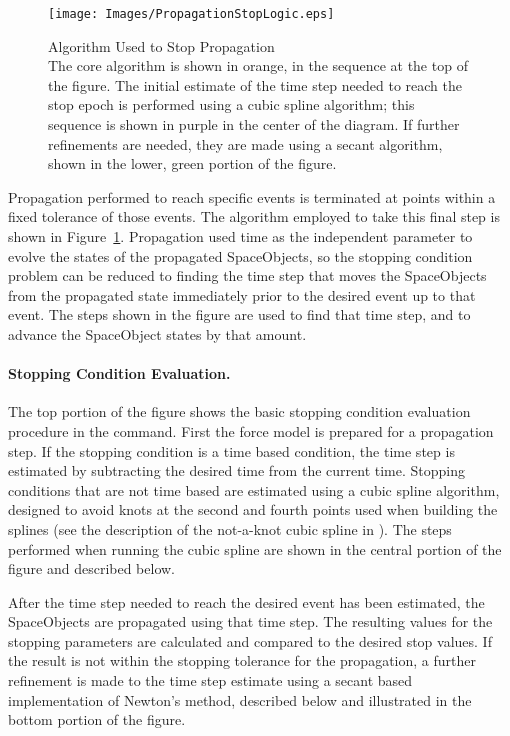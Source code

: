 \begin{figure}[htb]
\begin{center}
\texttt{[image: Images/PropagationStopLogic.eps]}
\begin{quote}
\caption[Algorithm Used to Stop Propagation]{\label{figure:StopAlgorithm}Algorithm Used to Stop
Propagation\\The core algorithm is shown in orange, in the sequence at the top of the figure.  The
initial estimate of the time step needed to reach the stop epoch is performed using a cubic spline
algorithm; this sequence is shown in purple in the center of the diagram.  If further refinements
are needed, they are made using a secant algorithm, shown in the lower, green portion of the
figure.}
\end{quote}
\end{center}
\end{figure}

Propagation performed to reach specific events is terminated at points within a fixed tolerance of
those events.  The algorithm employed to take this final step is shown in
Figure~\ref{figure:StopAlgorithm}.  Propagation used time as the independent parameter to evolve
the states of the propagated SpaceObjects, so the stopping condition problem can be reduced to
finding the time step that moves the SpaceObjects from the propagated state immediately prior to
the desired event up to that event.  The steps shown in the figure are used to find that time
step, and to advance the SpaceObject states by that amount.

\paragraph{Stopping Condition Evaluation.}  The top portion of the figure shows the basic stopping
condition evaluation procedure in the command.  First the force model is prepared for a propagation
step.  If the stopping condition is a time based condition, the time step is estimated by
subtracting the desired time from the current time.  Stopping conditions that are not time based are
estimated using a cubic spline algorithm, designed to avoid knots at the second and fourth points
used when building the splines (see the description of the not-a-knot cubic spline in
\cite{mathSpec}).  The steps performed when running the cubic spline are shown in the central
portion of the figure and described below.

After the time step needed to reach the desired event has been estimated, the SpaceObjects are
propagated using that time step.  The resulting values for the stopping parameters are calculated
and compared to the desired stop values.  If the result is not within the stopping tolerance for
the propagation, a further refinement is made to the time step estimate using a secant based
implementation of Newton's method, described below and illustrated in the bottom portion of the
figure.

